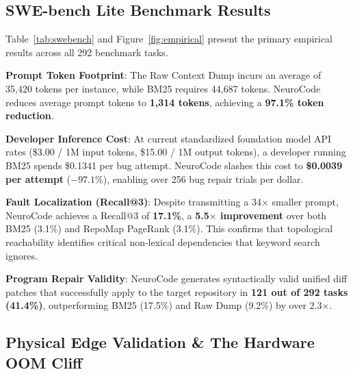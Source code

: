 \subsection{SWE-bench Lite Benchmark Results}

Table~\ref{tab:swebench} and Figure~\ref{fig:empirical} present the primary empirical results across all 292 benchmark tasks.

\textbf{Prompt Token Footprint}: The Raw Context Dump incurs an average of 35,420 tokens per instance, while BM25 requires 44,687 tokens. NeuroCode reduces average prompt tokens to \textbf{1,314 tokens}, achieving a \textbf{97.1\% token reduction}.

\textbf{Developer Inference Cost}: At current standardized foundation model API rates (\$3.00 / 1M input tokens, \$15.00 / 1M output tokens), a developer running BM25 spends \$0.1341 per bug attempt. NeuroCode slashes this cost to \textbf{\$0.0039 per attempt} ($-97.1\%$), enabling over 256 bug repair trials per dollar.

\textbf{Fault Localization (Recall@3)}: Despite transmitting a 34$\times$ smaller prompt, NeuroCode achieves a Recall@3 of \textbf{17.1\%}, a \textbf{5.5$\times$ improvement} over both BM25 (3.1\%) and RepoMap PageRank (3.1\%). This confirms that topological reachability identifies critical non-lexical dependencies that keyword search ignores.

\textbf{Program Repair Validity}: NeuroCode generates syntactically valid unified diff patches that successfully apply to the target repository in \textbf{121 out of 292 tasks (41.4\%)}, outperforming BM25 (17.5\%) and Raw Dump (9.2\%) by over 2.3$\times$.

\subsection{Physical Edge Validation \& The Hardware OOM Cliff}

